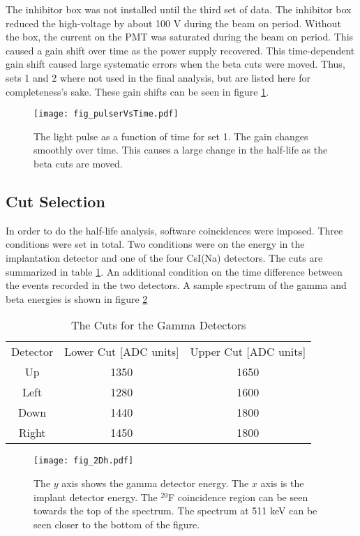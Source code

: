 \documentclass[MaxHughesThesis.tex]{subfiles}
\begin{document}
The inhibitor box was not installed until the third set of data. 
The inhibitor box reduced the high-voltage by about 100 V during the beam on period.
Without the box, the current on the PMT was saturated during the beam on period.
This caused a gain shift over time as the power supply recovered.
This time-dependent gain shift caused large systematic errors when the beta cuts were moved.
Thus, sets 1 and 2 where not used in the final analysis, but are listed here for completeness's sake.
These gain shifts can be seen in figure \ref{fig:pulserfig}.


\begin{figure}[!htb]
	\centerline{\texttt{[image: fig\_pulserVsTime.pdf]}}
	\caption{The light pulse as a function of time for set 1.
		 The gain changes smoothly over time.
		 This causes a large change in the half-life as the beta cuts are moved.}
	\label{fig:pulserfig}
\end{figure}

\subsection{Cut Selection}
In order to do the half-life analysis, software coincidences were imposed.
Three conditions were set in total.
Two conditions were on the energy in the implantation detector and one of the four CsI(Na) detectors.
The cuts are summarized in table \ref{tab:GammaCuts}.
An additional condition on the time difference between the events recorded in the two detectors. 
A sample spectrum of the gamma and beta energies is shown in figure \ref{fig:2DGraph}  

\begin{table}[!htb]
	\centering
	\caption{The Cuts for the Gamma Detectors}
	\begin{tabular}{ccc}
	Detector & Lower Cut [ADC units] & Upper Cut [ADC units] \\
	Up & 1350 & 1650 \\
	Left & 1280 & 1600\\
	Down & 1440 & 1800 \\
	Right & 1450 & 1800
	\end{tabular}
	\label{tab:GammaCuts}
\end{table}

\begin{figure}[!htb]
	\centerline{\texttt{[image: fig\_2Dh.pdf]}}
	\caption{The $y$ axis shows the gamma detector energy.
		   The $x$ axis is the implant detector energy.
		   The $^{20}$F coincidence region can be seen towards the top of the spectrum.
		   The spectrum at 511 keV can be seen closer to the bottom of the figure.
		   }
	\label{fig:2DGraph}
\end{figure}
\end{document}
